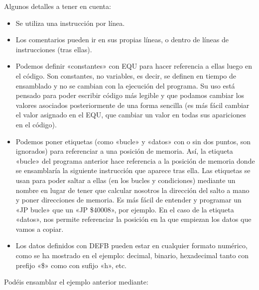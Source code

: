 \documentclass[letterpaper,10pt,spanish]{sphinxmanual}
\begin{document}
Algunos detalles a tener en cuenta:
\begin{itemize}
\item {} 
Se utiliza una instrucción por línea.

\item {} 
Los comentarios pueden ir en sus propias líneas, o dentro de líneas de instrucciones (tras ellas).

\item {} 
Podemos definir «constantes» con EQU para hacer referencia a ellas luego en el código. Son constantes, no variables, es decir, se definen en tiempo de ensamblado y no se cambian con la ejecución del programa. Su uso está pensado para poder escribir código más legible y que podamos cambiar los valores asociados posteriormente de una forma sencilla (es más fácil cambiar el valor asignado en el EQU, que cambiar un valor en todas sus apariciones en el código).

\item {} 
Podemos poner etiquetas (como «bucle» y «datos» \sphinxhyphen{}con o sin dos puntos, son ignorados\sphinxhyphen{}) para referenciar a una posición de memoria. Así, la etiqueta «bucle» del programa anterior hace referencia a la posición de memoria donde se ensamblaría la siguiente instrucción que aparece tras ella. Las etiquetas se usan para poder saltar a ellas (en los bucles y condiciones) mediante un nombre en lugar de tener que calcular nosotros la dirección del salto a mano y poner direcciones de memoria. Es más fácil de entender y programar un «JP bucle» que un «JP \$40008», por ejemplo. En el caso de la etiqueta «datos», nos permite referenciar la posición en la que empiezan los datos que vamos a copiar.

\item {} 
Los datos definidos con DEFB pueden estar en cualquier formato numérico, como se ha mostrado en el ejemplo: decimal, binario, hexadecimal tanto con prefijo «\$» como con sufijo «h», etc.

\end{itemize}

Podéis ensamblar el ejemplo anterior mediante:

\begin{sphinxVerbatim}[commandchars=\\\{\}]
   
\end{sphinxVerbatim}
\end{document}
